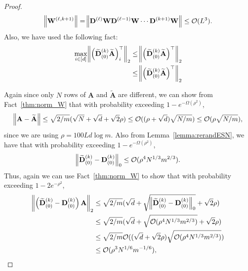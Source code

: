 \begin{proof}
	\begin{align}
		\norm{\mathbf{W}^{(\ell, k+1)}} = \norm{\mathbf{D}^{(\ell)} \mathbf{W} \mathbf{D}^{(\ell-1)} \mathbf{W} \cdots \mathbf{D}^{(k+1)} \mathbf{W}} \le \mathcal{O}(L^3) \label{eq:normWk}.
	\end{align}
	Also, we have used the following fact:
	\begin{align*}
		\max_{i \in [d]}  \norm{ \left(\widetilde{\mathbf{D}}_{(0)}^{(k)} \widetilde{\mathbf{A}}\right)^{\top}_i}_2 &\le \norm{ \left(\widetilde{\mathbf{D}}_{(0)}^{(k)} \widetilde{\mathbf{A}}\right)^{\top}}_2 \\& \le \norm{ \left(\widetilde{\mathbf{D}}_{(0)}^{(k)} \widetilde{\mathbf{A}}\right)^{\top}}_2
	\end{align*}
	
	Again since only $N$ rows of $\mathbf{A}$ and $\widetilde{\mathbf{A}}$ are different, we can show from Fact~\ref{thm:norm_W} that with probability exceeding $1 - e^{-\Omega(\rho^2)}$,
	\begin{align}
		\norm{\mathbf{A} - \widetilde{\mathbf{A}}} \le  \sqrt{2/m}(\sqrt{N} + \sqrt{d} + \sqrt{2}\rho) \le  \mathcal{O}((\rho + \sqrt{d}) \sqrt{N/m}) \le \mathcal{O}(\rho \sqrt{N/m}) \label{eq:tildeAA},
	\end{align}
	since we are using $\rho = 100Ld \log m$. Also from Lemma~\ref{lemma:rerandESN}, we have that with probability exceeding $1 - e^{-\Omega(\rho^2)}$, 
	\begin{align*}
		\norm{\widetilde{\mathbf{D}}^{(k)}_{(0)} - \mathbf{D}^{(k)}_{(0)}}_0 \le \mathcal{O}(\rho^4 N^{1/3} m^{2/3}).
	\end{align*}
	Thus, again we can use Fact~\ref{thm:norm_W} to show that with probability exceeding $1 - 2e^{-\rho^2}$,
	\begin{align}
		\norm{\left( \widetilde{\mathbf{D}}^{(k)}_{(0)} - \mathbf{D}^{(k)}_{(0)}\right) \mathbf{A}}_2  &
		\le \sqrt{2/m} (\sqrt{d} + \sqrt{\norm{\widetilde{\mathbf{D}}^{(k)}_{(0)} - \mathbf{D}^{(k)}_{(0)}}_0} + \sqrt{2} \rho)
		\nonumber \\&
		\le \sqrt{2/m} (\sqrt{d} + \sqrt{\mathcal{O}(\rho^4 N^{1/3} m^{2/3})} + \sqrt{2} \rho) \nonumber\\&
		\le \sqrt{2/m} \mathcal{O} ((\sqrt{d} + \sqrt{2} \rho) \sqrt{\mathcal{O}(\rho^4 N^{1/3} m^{2/3})} ) \nonumber
		\\&\le \mathcal{O}(\rho^{3} N^{1/6} m^{-1/6}) \label{eq:DAtildeDA},
	\end{align}

\end{proof}
